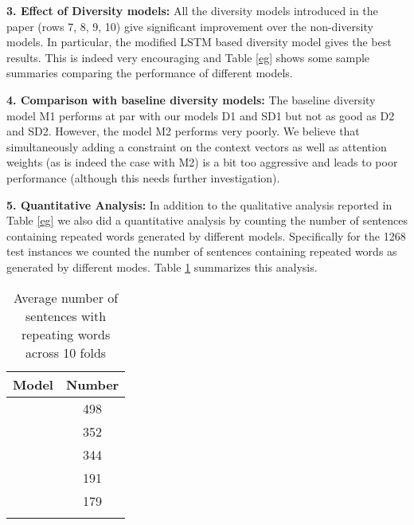 \documentclass[11pt]{article}
\begin{document}
\noindent \textbf{3. Effect of Diversity models:} All the diversity models introduced in the paper (rows 7, 8, 9, 10) give significant improvement over the non-diversity models. In particular, the modified LSTM based diversity model gives the best results. This is indeed very encouraging and Table \ref{eg} shows some sample summaries comparing the performance of different models.

\noindent \textbf{4. Comparison with baseline diversity models:} The baseline diversity model M1 performs at par with our models D1 and SD1 but not as good as D2 and SD2. However, the model M2 performs very poorly. We believe that simultaneously adding a constraint on the context vectors as well as attention weights (as is indeed the case with M2) is a bit too aggressive and leads to poor performance (although this needs further investigation).

\noindent \textbf{5. Quantitative Analysis:} In addition to the qualitative analysis reported in Table \ref{eg} we also did a quantitative analysis by counting the number of sentences containing repeated words generated by different models. Specifically for the 1268 test instances we counted the number of sentences containing repeated words as generated by different modes. Table \ref{table_rep} summarizes this analysis. 
\begin{center}
\begin{table}[!tbh]
\begin{center}
\begin{tabular}{cc}
\hline
Model & Number\\
\hline
\textbf{} & 498\\
\textbf{} & 352  \\
\textbf{} & 344 \\
\textbf{} & 191 \\
\textbf{} & 179\\ 
\hline
&\\
\end{tabular}
\end{center}
\caption{Average number of sentences with repeating words across 10 folds}
\label{table_rep}
\end{table}
\end{center}
\end{document}
